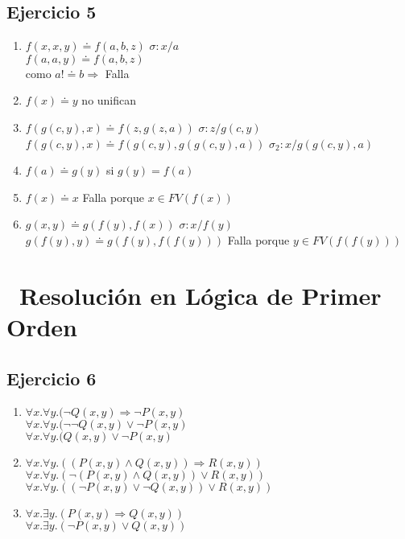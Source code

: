 \documentclass[10pt,a4paper]{article}
\begin{document}
\subsection{Ejercicio 5 }
\begin{enumerate}
    \item $f(x,x,y) \doteq f(a,b,z)$ $\sigma:{x/a}$ \\
    $f(a,a,y) \doteq f(a,b,z)$ \\
    como $a ! \doteq b \Rightarrow$ Falla 
    \item $f(x) \doteq y$ no unifican
    \item $f(g(c,y),x) \doteq f(z,g(z,a))$ $\sigma:{z/g(c,y)}$
    $f(g(c,y),x) \doteq f(g(c,y),g(g(c,y),a))$ $\sigma_{2}:{x/g(g(c,y),a)}$
    \item $f(a) \doteq g(y)$ si $g(y)=f(a)$
    \item $f(x) \doteq x$ Falla porque $x \in FV(f(x))$
    \item $g(x,y) \doteq g(f(y),f(x))$ $\sigma:{x/f(y)}$
    $g(f(y),y) \doteq g(f(y),f(f(y)))$ Falla porque $y \in FV(f(f(y)))$
\end{enumerate}

\section*{\ Resolución en Lógica de Primer Orden}
\subsection{Ejercicio 6}
    \begin{enumerate}
        \item $\forall x.  \forall y. ( \lnot Q(x,y) \Rightarrow \lnot P(x,y)$ \\
        $\forall x.  \forall y. ( \lnot \lnot Q(x,y) \lor \lnot P(x,y)$ \\
        $\forall x.  \forall y. ( Q(x,y) \lor \lnot P(x,y)$
        \item $\forall x.  \forall y. ((P(x,y) \land Q(x,y)) \Rightarrow R(x,y))$ \\
        $\forall x.  \forall y. (\lnot (P(x,y) \land Q(x,y)) \lor R(x,y))$ \\
        $\forall x.  \forall y. ((\lnot P(x,y) \lor \lnot Q(x,y)) \lor R(x,y))$
        \item $\forall x.  \exists y. (P(x,y) \Rightarrow Q(x,y))$ \\
        $\forall x.  \exists y. (\lnot P(x,y) \lor Q(x,y))$
    \end{enumerate}
\end{document}
